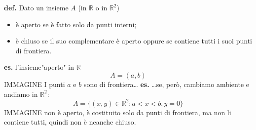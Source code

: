 \newline
\textbf{def.} Dato un insieme $A$ (in $\mathbb{R}$ o in $\mathbb{R}^2$)
\begin{itemize}
    \item è aperto se è fatto solo da punti interni;
    \item è chiuso se il suo complementare è aperto oppure se contiene tutti i suoi punti di frontiera.
\end{itemize}
\textbf{es.} l'insieme"aperto" in $\mathbb{R}$
\[
    A = (a,b)
\] 
IMMAGINE
\newline
I punti $a$ e $b$ sono di frontiera\dots
\newline
\textbf{es.} \dots se, però, cambiamo ambiente e andiamo in $\mathbb{R}^2$:
\[
    A = \{(x,y) \in \mathbb{R}^2 : a < x < b, y = 0\}
\] 
IMMAGINE
\newline
non è aperto, è costituito solo da punti di frontiera, ma non li contiene tutti, quindi non è neanche chiuso.

\newpage